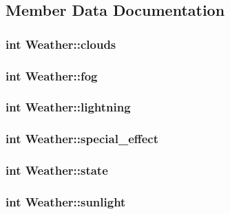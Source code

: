 \subsection{Member Data Documentation}
\hypertarget{classWeather_a9f547babbc20e54f3b2867b90588b5e4}{
\subsubsection[{clouds}]{\setlength{\rightskip}{0pt plus 5cm}int Weather\-::clouds}}\label{classWeather_a9f547babbc20e54f3b2867b90588b5e4}
\hypertarget{classWeather_a01aefe5b420d80cfad47e9f284d79626}{
\subsubsection[{fog}]{\setlength{\rightskip}{0pt plus 5cm}int Weather\-::fog}}\label{classWeather_a01aefe5b420d80cfad47e9f284d79626}
\hypertarget{classWeather_a2e6daf8e8ebd008546e41d16899b38fc}{
\subsubsection[{lightning}]{\setlength{\rightskip}{0pt plus 5cm}int Weather\-::lightning}}\label{classWeather_a2e6daf8e8ebd008546e41d16899b38fc}
\hypertarget{classWeather_aaf92329f8976174333b59190d6f7d394}{
\subsubsection[{special\-\_\-effect}]{\setlength{\rightskip}{0pt plus 5cm}int Weather\-::special\-\_\-effect}}\label{classWeather_aaf92329f8976174333b59190d6f7d394}
\hypertarget{classWeather_a4c7ab25a82283c8c7a2b3b952f2b3774}{
\subsubsection[{state}]{\setlength{\rightskip}{0pt plus 5cm}int Weather\-::state}}\label{classWeather_a4c7ab25a82283c8c7a2b3b952f2b3774}
\hypertarget{classWeather_ab40997fa4f5013a26576cd73f9e8befa}{
\subsubsection[{sunlight}]{\setlength{\rightskip}{0pt plus 5cm}int Weather\-::sunlight}}\label{classWeather_ab40997fa4f5013a26576cd73f9e8befa}
